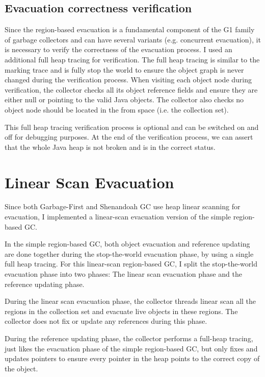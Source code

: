 \subsection{Evacuation correctness verification}

Since the region-based evacuation is a fundamental component of the G1 family of garbage collectors
and can have several variants (e.g. concurrent evacuation), it is necessary to verify the correctness of the evacuation process.
I used an additional full heap tracing for verification. The full heap tracing is
similar to the marking trace and is fully stop the world to ensure the object graph is never changed
during the verification process.
When visiting each object node during verification, the collector checks all its object reference fields
and ensure they are either null or pointing to the valid Java objects.
The collector also checks no object node should be located in the from space (i.e. the collection set).

This full heap tracing verification process is optional and can be switched on and off for
debugging purposes.
At the end of the verification process, we can assert that the whole Java heap is
not broken and is in the correct status.

\section{Linear Scan Evacuation}
\label{sec:linearscangc}

Since both Garbage-First and Shenandoah GC use heap linear scanning for evacuation,
I implemented a linear-scan evacuation version of the simple region-based GC.

In the simple region-based GC, both object evacuation and reference updating are
done together during the stop-the-world evacuation phase, by using a single full heap tracing.
For this linear-scan region-based GC, I split the stop-the-world evacuation phase into
two phases: The linear scan evacuation phase and the reference updating phase.

During the linear scan evacuation phase, the collector threads linear scan all the regions
in the collection set and evacuate live objects in these regions. The collector does not
fix or update any references during this phase.

During the reference updating phase, the collector performs a full-heap tracing,
just likes the evacuation phase of the simple region-based GC, but only fixes and updates
pointers to ensure every pointer in the heap points to the correct copy of the object.

